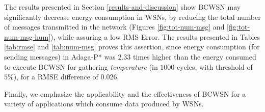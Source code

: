 \documentclass{acm_proc_article-sp}
\begin{document}
The results presented in Section \ref{results-and-discussion} show BCWSN may
significantly decrease energy consumption in WSNs, by reducing the total number
of messages transmitted in the network (Figures \ref{fig:tot-num-msg} and
\ref{fig:tot-num-msg-hum}), while assuring a low RMS Error. The results
presented in Tables \ref{tab:rmse} and \ref{tab:num-msg} proves this assertion,
since energy consumption (for sending messages) in Adaga-P* was $2.33$ times
higher than the energy consumed to execute BCWSN for gathering {\it temperature}
(in $1000$ cycles, with threshold of $5\%$), for a RMSE difference of $0.026$.
\vspace*{-.6cm}

Finally, we emphasize the applicability and the effectiveness of BCWSN for a
variety of applications which consume data produced by WSNs.





  
\end{document}
